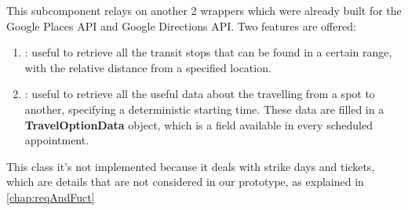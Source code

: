 This subcomponent relays on another 2 wrappers which were already built for the Google Places API and Google Directions API. Two features are offered:

\begin{enumerate}
\item {}: useful to retrieve all the transit stops that can be found in a certain range, with the relative distance from a specified location.
\item {}: useful to retrieve all the useful data about the travelling from a spot to another, specifying a deterministic starting time. These data are filled in a \textbf{TravelOptionData} object, which is a field available in every scheduled appointment.
\end{enumerate}

This class it's not implemented because it deals with strike days and tickets, which are details that are not considered in our prototype, as explained in \ref{chap:reqAndFuct}


